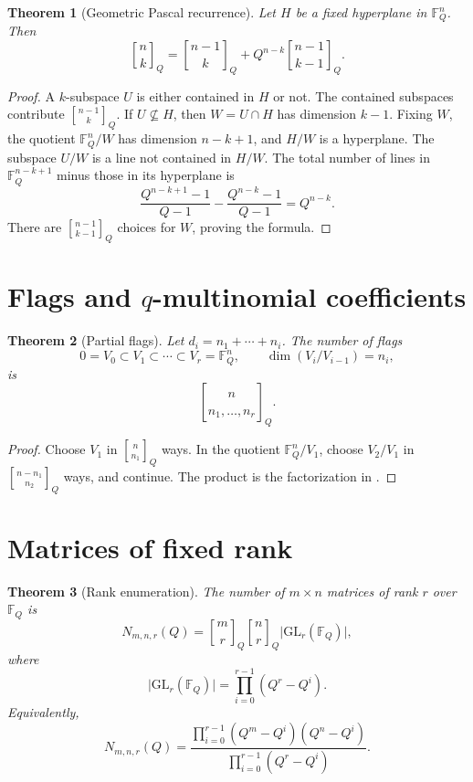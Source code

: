 \documentclass[11pt,oneside,openany]{book}
\newtheorem{theorem}{Theorem}[chapter]
\theoremstyle{definition}
\theoremstyle{remark}
\newcommand{\Qbinom}[3]{\genfrac{[}{]}{0pt}{}{#1}{#2}_{#3}}
\newcommand{\F}{\mathbb F}
\newcommand{\abs}[1]{\lvert #1\rvert}
\begin{document}
\begin{theorem}[Geometric Pascal recurrence]\label{thm:geometric-pascal}
Let $H$ be a fixed hyperplane in $\F_Q^n$.  Then
\[
 \Qbinom nkQ
 =\Qbinom{n-1}{k}Q+Q^{n-k}\Qbinom{n-1}{k-1}Q.
\]
\end{theorem}

\begin{proof}
A $k$-subspace $U$ is either contained in $H$ or not.  The contained subspaces contribute $\Qbinom{n-1}{k}Q$.  If $U\not\subseteq H$, then $W=U\cap H$ has dimension $k-1$.  Fixing $W$, the quotient $\F_Q^n/W$ has dimension $n-k+1$, and $H/W$ is a hyperplane.  The subspace $U/W$ is a line not contained in $H/W$.  The total number of lines in $\F_Q^{n-k+1}$ minus those in its hyperplane is
\[
 \frac{Q^{n-k+1}-1}{Q-1}-\frac{Q^{n-k}-1}{Q-1}=Q^{n-k}.
\]
There are $\Qbinom{n-1}{k-1}Q$ choices for $W$, proving the formula.
\end{proof}

\section{Flags and \texorpdfstring{$q$}{q}-multinomial coefficients}

\begin{theorem}[Partial flags]\label{thm:flag-count}
Let $d_i=n_1+\cdots+n_i$.  The number of flags
\[
 0=V_0\subset V_1\subset\cdots\subset V_r=\F_Q^n,
 \qquad \dim(V_i/V_{i-1})=n_i,
\]
is
\[
 \genfrac{[}{]}{0pt}{}{n}{n_1,\dots,n_r}_{Q}.
\]
\end{theorem}

\begin{proof}
Choose $V_1$ in $\Qbinom n{n_1}Q$ ways.  In the quotient $\F_Q^n/V_1$, choose $V_2/V_1$ in $\Qbinom{n-n_1}{n_2}Q$ ways, and continue.  The product is the factorization in .
\end{proof}

\section{Matrices of fixed rank}

\begin{theorem}[Rank enumeration]\label{thm:rank-matrices}
The number of $m\times n$ matrices of rank $r$ over $\F_Q$ is
\[
 N_{m,n,r}(Q)
 =\Qbinom mrQ\Qbinom nrQ\abs{\mathrm{GL}_r(\F_Q)},
\]
where
\[
 \abs{\mathrm{GL}_r(\F_Q)}=\prod_{i=0}^{r-1}(Q^r-Q^i).
\]
Equivalently,
\[
 N_{m,n,r}(Q)
 =\frac{\prod_{i=0}^{r-1}(Q^m-Q^i)(Q^n-Q^i)}
 {\prod_{i=0}^{r-1}(Q^r-Q^i)}.
\]
\end{theorem}
\end{document}
